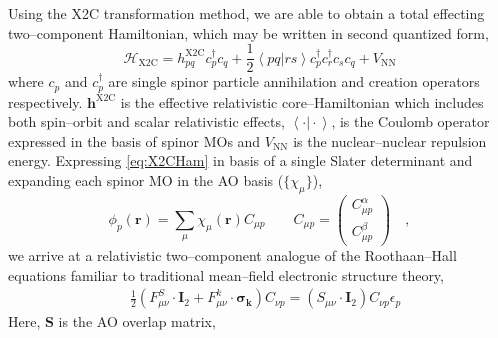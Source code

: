 \documentclass[12pt]{article}
\newcommand{\inner}[2]{\left\langle #1 \left\vert\right. #2 \right\rangle}            %
\newcommand*\vc[1]{\boldsymbol{#1}}
\newcommand*\op[1]{\mathcal{#1}}
\begin{document}
Using the X2C transformation method, we are able to obtain a total effecting
two--component Hamiltonian, which may be written in second quantized form,
\begin{equation}
\op{H}_\mathrm{X2C} = h_{pq}^\mathrm{X2C}c_p^\dagger c_q + 
  \frac{1}{2} \inner{pq}{rs} c_p^\dagger c_r^\dagger c_s c_q + V_\mathrm{NN}
  \label{eq:X2CHam}
\end{equation}
where $c_p$ and $c_p^\dagger$ are single spinor particle annihilation and
creation operators respectively. $\vc{h}^\mathrm{X2C}$ is the effective
relativistic core--Hamiltonian which includes both spin--orbit and scalar
relativistic effects, $\inner{\cdot}{\cdot}$, is the Coulomb operator expressed
in the basis of spinor MOs and $V_\mathrm{NN}$ is the nuclear--nuclear repulsion
energy. Expressing \cref{eq:X2CHam} in basis of a single Slater determinant and
expanding each spinor MO in the AO basis ($\lbrace \chi_\mu \rbrace$),
\begin{equation}
\phi_p ( \vc{r} ) = \sum_\mu \chi_\mu(\vc{r}) C_{\mu p}
\qquad
C_{\mu p} = \begin{pmatrix}
C_{\mu p}^\alpha \\ C_{\mu p}^\beta
\end{pmatrix}
\quad , \label{eq:AO2MO}
\end{equation}
we arrive at a relativistic two--component analogue of the Roothaan--Hall
equations familiar to traditional mean--field electronic structure theory,
\begin{align}
&\frac{1}{2}\left(
  F^S_{\mu\nu} \cdot \vc{I}_2 + F^k_{\mu\nu} \cdot \vc{\sigma_k}
\right) C_{\nu p} = (S_{\mu\nu}\cdot \vc{I}_2) C_{\nu p}
\epsilon_p\label{eq:Roothaan}
\end{align}
Here, $\vc{S}$ is the AO overlap matrix, 
\end{document}

